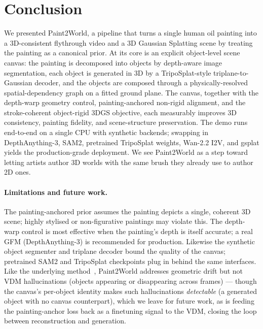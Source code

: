 
\section{Conclusion}
\label{sec:conclusion}

We presented Paint2World, a pipeline that turns a single human oil painting
into a 3D-consistent flythrough video and a 3D Gaussian Splatting scene by
treating the painting as a canonical prior. At its core is an explicit
object-level scene canvas: the painting is decomposed into objects by
depth-aware image segmentation, each object is generated in 3D by a
TripoSplat-style triplane-to-Gaussian decoder, and the objects are composed
through a physically-resolved spatial-dependency graph on a fitted ground
plane. The canvas, together with the depth-warp geometry control,
painting-anchored non-rigid alignment, and the stroke-coherent object-rigid
3DGS objective, each measurably improves 3D consistency, painting fidelity,
and scene-structure preservation. The demo runs end-to-end on a single CPU
with synthetic backends; swapping in DepthAnything-3, SAM2, pretrained
TripoSplat weights, Wan-2.2 I2V, and gsplat yields the production-grade
deployment. We see Paint2World as a step toward letting artists author 3D
worlds with the same brush they already use to author 2D ones.

\paragraph{Limitations and future work.}
The painting-anchored prior assumes the painting depicts a single, coherent
3D scene; highly stylised or non-figurative paintings may violate this. The
depth-warp control is most effective when the painting's depth is itself
accurate; a real GFM (DepthAnything-3) is recommended for production.
Likewise the synthetic object segmenter and triplane decoder bound the
quality of the canvas; pretrained SAM2 and TripoSplat checkpoints plug in
behind the same interfaces. Like the underlying
method~\cite{hoellein2026worldreconstruction}, Paint2World addresses
geometric drift but not VDM hallucinations (objects appearing or disappearing
across frames) --- though the canvas's per-object identity makes such
hallucinations \emph{detectable} (a generated object with no canvas
counterpart), which we leave for future work, as is feeding the
painting-anchor loss back as a finetuning signal to the VDM, closing the
loop between reconstruction and generation.
